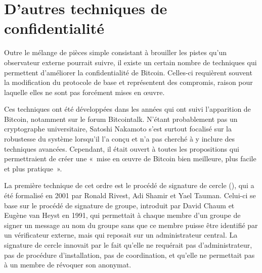\section*{D'autres techniques de confidentialité}


Outre le mélange de pièces simple consistant à brouiller les pistes qu'un observateur externe pourrait suivre, il existe un certain nombre de techniques qui permettent d'améliorer la confidentialité de Bitcoin. Celles-ci requièrent souvent la modification du protocole de base et représentent des compromis, raison pour laquelle elles ne sont pas forcément mises en œuvre.

Ces techniques ont été développées dans les années qui ont suivi l'apparition de Bitcoin, notamment sur le forum Bitcointalk. N'étant probablement pas un cryptographe universitaire, Satoshi Nakamoto s'est surtout focalisé sur la robustesse du système lorsqu'il l'a conçu et n'a pas cherché à y inclure des techniques avancées. Cependant, il était ouvert à toutes les propositions qui permettraient de créer une «~mise en œuvre de Bitcoin bien meilleure, plus facile et plus pratique~».



La première technique de cet ordre est le procédé de signature de cercle (), qui a été formalisé en 2001 par Ronald Rivest, Adi Shamir et Yael Tauman. Celui-ci se base sur le procédé de signature de groupe, introduit par David Chaum et Eugène van Heyst en 1991, qui permettait à chaque membre d'un groupe de signer un message au nom du groupe sans que ce membre puisse être identifié par un vérificateur externe, mais qui reposait sur un administrateur central. La signature de cercle innovait par le fait qu'elle ne requérait pas d'administrateur, pas de procédure d'installation, pas de coordination, et qu'elle ne permettait pas à un membre de révoquer son anonymat.

